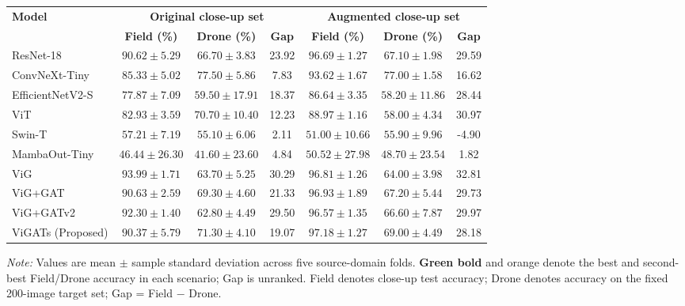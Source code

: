 \documentclass[]{interact}
\theoremstyle{plain}
\theoremstyle{definition}
\theoremstyle{remark}
\newcommand{\bestresult}[1]{\textcolor{bestgreen}{\textbf{#1}}}
\newcommand{\secondresult}[1]{\textcolor{secondorange}{#1}}
\begin{document}
{\begin{table}[H]
\footnotesize
\setlength{\tabcolsep}{3.2pt}
{\begin{tabular}{lcccccc} \toprule
\multirow{2}{*}{\textbf{Model}} & \multicolumn{3}{c}{\textbf{Original close-up set}} & \multicolumn{3}{c}{\textbf{Augmented close-up set}} \\ \cmidrule(lr){2-4} \cmidrule(lr){5-7}
 & \textbf{Field (\%)} & \textbf{Drone (\%)} & \textbf{Gap} & \textbf{Field (\%)} & \textbf{Drone (\%)} & \textbf{Gap} \\ \midrule
ResNet-18 \citep{he2016deep} & $90.62 \pm 5.29$ & $66.70 \pm 3.83$ & 23.92 & $96.69 \pm 1.27$ & $67.10 \pm 1.98$ & 29.59 \\
ConvNeXt-Tiny \citep{liu2022convnext} & $85.33 \pm 5.02$ & \bestresult{$77.50 \pm 5.86$} & 7.83 & $93.62 \pm 1.67$ & \bestresult{$77.00 \pm 1.58$} & 16.62 \\
EfficientNetV2-S \citep{tan2021efficientnetv2} & $77.87 \pm 7.09$ & $59.50 \pm 17.91$ & 18.37 & $86.64 \pm 3.35$ & $58.20 \pm 11.86$ & 28.44 \\
ViT \citep{dosovitskiy2020image} & $82.93 \pm 3.59$ & $70.70 \pm 10.40$ & 12.23 & $88.97 \pm 1.16$ & $58.00 \pm 4.34$ & 30.97 \\
Swin-T \citep{liu2021swin} & $57.21 \pm 7.19$ & $55.10 \pm 6.06$ & 2.11 & $51.00 \pm 10.66$ & $55.90 \pm 9.96$ & -4.90 \\
MambaOut-Tiny \citep{yu2024mambaout} & $46.44 \pm 26.30$ & $41.60 \pm 23.60$ & 4.84 & $50.52 \pm 27.98$ & $48.70 \pm 23.54$ & 1.82 \\
ViG \citep{han2022vision} & \bestresult{$93.99 \pm 1.71$} & $63.70 \pm 5.25$ & 30.29 & $96.81 \pm 1.26$ & $64.00 \pm 3.98$ & 32.81 \\
ViG+GAT \citep{velickovic2018graph} & $90.63 \pm 2.59$ & $69.30 \pm 4.60$ & 21.33 & \secondresult{$96.93 \pm 1.89$} & $67.20 \pm 5.44$ & 29.73 \\
ViG+GATv2 \citep{brody2022gat} & \secondresult{$92.30 \pm 1.40$} & $62.80 \pm 4.49$ & 29.50 & $96.57 \pm 1.35$ & $66.60 \pm 7.87$ & 29.97 \\
ViGATs (Proposed) & $90.37 \pm 5.79$ & \secondresult{$71.30 \pm 4.10$} & 19.07 & \bestresult{$97.18 \pm 1.27$} & \secondresult{$69.00 \pm 4.49$} & 28.18 \\
\bottomrule
\end{tabular}}
\label{tab:crossdomain}
\parbox{\textwidth}{\vspace{2pt}\footnotesize\textit{Note:} Values are mean $\pm$ sample standard deviation across five source-domain folds. \bestresult{Green bold} and \secondresult{orange} denote the best and second-best Field/Drone accuracy in each scenario; Gap is unranked. Field denotes close-up test accuracy; Drone denotes accuracy on the fixed 200-image target set; Gap = Field $-$ Drone.}
\end{table}

}
\end{document}
